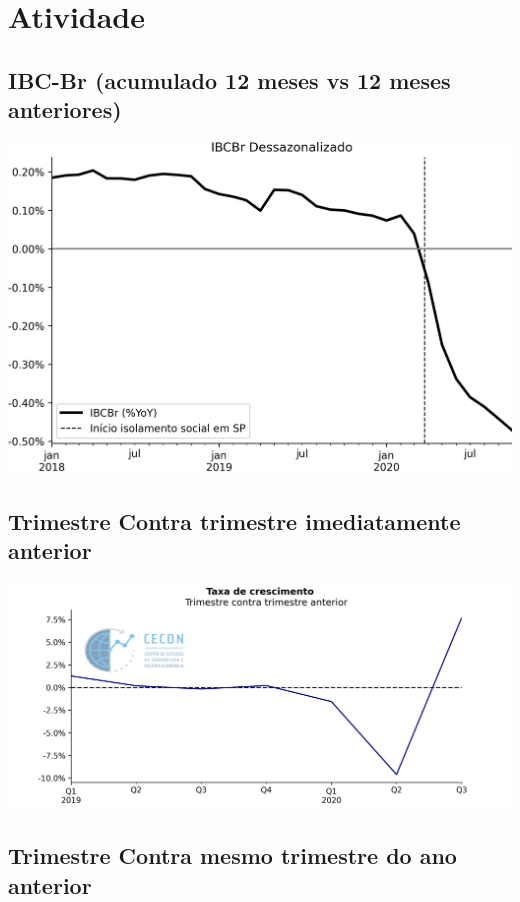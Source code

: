 \documentclass{SelfArx}
\begin{document}
\section*{Atividade}
\label{sec:orgdfb4d84}

\subsection*{IBC-Br (acumulado 12 meses vs 12 meses anteriores)}
\label{sec:org4f0ae5f}

\begin{center}
\includegraphics[width=.9\linewidth]{./figs/Antecedente/IBCBr.png}
\end{center}



\subsection*{Trimestre Contra trimestre imediatamente anterior}
\label{sec:org6c95008}

\begin{center}
\includegraphics[width=.9\linewidth]{./figs/PIB/PIB.png}
\end{center}

\subsection*{Trimestre Contra mesmo trimestre do ano anterior}
\label{sec:org36b31cd}
\end{document}
